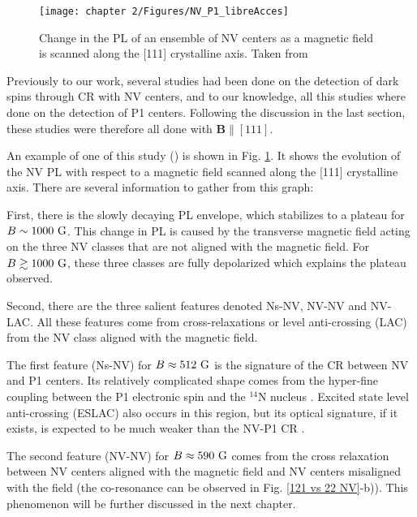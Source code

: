 \documentclass[a4paper,11pt]{report}
\begin{document}
\begin{refsection}
\begin{figure}[h]
\centering
\texttt{[image: chapter 2/Figures/NV\_P1\_libreAcces]}
\caption{Change in the PL of an ensemble of NV centers as a magnetic field is scanned along the [111] crystalline axis. Taken from \citep{armstrong2010nv}}
\label{CR P1 exp}
\end{figure}

Previously to our work, several studies \citep{van1989cross, holliday1989optical, epstein2005anisotropic, armstrong2010nv,   hall2016detection, wickenbrock2016microwave,  wood2016wide,  alfasi2019detection, lazda2021cross} had been done on the detection of dark spins through CR with NV centers, and to our knowledge, all this studies where done on the detection of P1 centers. Following the discussion in the last section, these studies were therefore all done with $\mathbf{B} \parallel [111]$.

An example of one of this study (\citep{armstrong2010nv}) is shown in Fig. \ref{CR P1 exp}. It shows the evolution of the NV PL with respect to a magnetic field scanned along the [111] crystalline axis. There are several information to gather from this graph:

First, there is the slowly decaying PL envelope, which stabilizes to a plateau for $B\sim 1000\ \rm G$. This change in PL is caused by the transverse magnetic field acting on the three NV classes that are not aligned with the magnetic field. For $B \gtrsim 1000\ \rm G$, these three classes are fully depolarized which explains the plateau observed.

Second, there are the three salient features denoted Ns-NV, NV-NV and NV-LAC. All these features come from cross-relaxations or level anti-crossing (LAC) from the NV class aligned with the magnetic field.

The first feature (Ns-NV) for $B\approx 512 \ \rm G$ is the signature of the CR between NV and P1 centers. Its relatively complicated shape comes from the hyper-fine coupling between the P1 electronic spin and the $^{14}$N nucleus \citep{lazda2021cross}. Excited state level anti-crossing (ESLAC) also occurs in this region, but its optical signature, if it exists, is expected to be much weaker than the NV-P1 CR \citep{zheng2017level}.

The second feature (NV-NV) for $B\approx 590 \ \rm G$ comes from the cross relaxation between NV centers aligned with the magnetic field and NV centers misaligned with the field (the co-resonance can be observed in Fig. \ref{121 vs 22 NV}-b)). This phenomenon will be further discussed in the next chapter.


\end{refsection}
\end{document}
